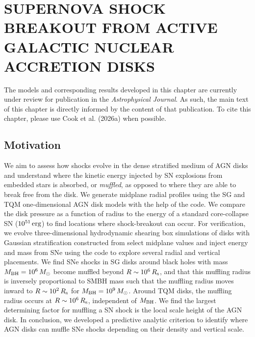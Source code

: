 \section{\texorpdfstring{\MakeUppercase{supernova shock breakout from active galactic nuclear accretion disks}}{supernova shock breakout from active galactic nuclear accretion disks}}
\label{sec:sn-hydrodynamics}


\par The models and corresponding results developed in this chapter are currently under review for publication in the \textit{Astrophysical Journal}.
As such, the main text of this chapter is directly informed by the content of that publication.
To cite this chapter, please use Cook et al. (2026a) when possible.

\subsection{Motivation}
\label{sec:motivation-snhydro}
We aim to assess how shocks evolve in the dense stratified medium of AGN disks and understand where the kinetic energy injected by SN explosions from embedded stars is absorbed, or \emph{muffled}, as opposed to where they are able to break free from the disk.
We generate midplane radial profiles using the SG and TQM one-dimensional AGN disk models with the help of the  code.
We compare the disk pressure as a function of radius to the energy of a standard core-collapse SN ($10^{51}\,{\rm erg}$) to find locations where shock-breakout can occur.
For verification, we evolve three-dimensional hydrodynamic shearing box simulations of disks with Gaussian stratification constructed from select midplane values and inject energy and mass from SNe using the  code to explore several radial and vertical placements.
We find SNe shocks in SG disks around black holes with mass $M_{\rm BH}=10^6\,M_{\odot}$ become muffled beyond $R\sim10^6\,R_{\rm s}$, and that this muffling radius is inversely proportional to SMBH mass such that the muffling radius moves inward to $R\sim10^2\,R_{\rm s}$ for $M_{\rm BH}=10^9\,M_{\odot}$.
Around TQM disks, the muffling radius occurs at $R\sim10^6\,R_{\rm s}$, independent of $M_{\rm BH}$.
We find the largest determining factor for muffling a SN shock is the local scale height of the AGN disk.
In conclusion, we developed a predictive analytic criterion to identify where AGN disks can muffle SNe shocks depending on their density and vertical scale.

